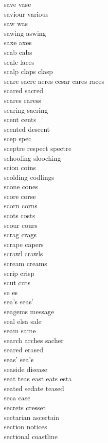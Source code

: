save vase\\
saviour various\\
saw was\\
sawing aswing\\
saxe axes\\
scab cabs\\
scale laces\\
scalp claps clasp\\
scare sacre acres cesar cares races\\
scared sacred\\
scares caress\\
scaring sacring\\
scent cents\\
scented descent\\
scep spec\\
sceptre respect spectre\\
schooling slooching\\
scion coins\\
scolding codlings\\
scone cones\\
score corse\\
scorn corns\\
scots costs\\
scour cours\\
scrag crags\\
scrape capers\\
scrawl crawls\\
scream creams\\
scrip crisp\\
scut cuts\\
se es\\
sea's seas'\\
seagems message\\
seal elsa sale\\
seam same\\
search arches sacher\\
seared erased\\
seas' sea's\\
seaside disease\\
seat teas east eats esta\\
seated sedate teased\\
seca case\\
secrets cresset\\
sectarian ascertain\\
section notices\\
sectional coastline\\
